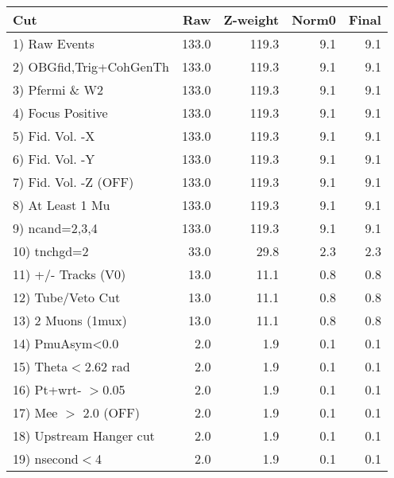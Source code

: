  \begin{table}[h!]\centering
 \begin{tabular}{||l||r|r|r|r||}
 \hline
 \hline
 Cut & Raw & Z-weight & Norm0 & Final \\
 \hline
  1) Raw Events           &       133.0 &       119.3 &         9.1 &         9.1 \\
  2) OBGfid,Trig+CohGenTh &       133.0 &       119.3 &         9.1 &         9.1 \\
  3) Pfermi \& W2         &       133.0 &       119.3 &         9.1 &         9.1 \\
  4) Focus Positive       &       133.0 &       119.3 &         9.1 &         9.1 \\
  5) Fid. Vol. -X         &       133.0 &       119.3 &         9.1 &         9.1 \\
  6) Fid. Vol. -Y         &       133.0 &       119.3 &         9.1 &         9.1 \\
  7) Fid. Vol. -Z (OFF)   &       133.0 &       119.3 &         9.1 &         9.1 \\
  8) At Least 1 Mu        &       133.0 &       119.3 &         9.1 &         9.1 \\
  9) ncand=2,3,4          &       133.0 &       119.3 &         9.1 &         9.1 \\
 10) tnchgd=2             &        33.0 &        29.8 &         2.3 &         2.3 \\
 11) +/- Tracks (V0)      &        13.0 &        11.1 &         0.8 &         0.8 \\
 12) Tube/Veto Cut        &        13.0 &        11.1 &         0.8 &         0.8 \\
 13) 2 Muons (1mux)       &        13.0 &        11.1 &         0.8 &         0.8 \\
 14) PmuAsym<0.0          &         2.0 &         1.9 &         0.1 &         0.1 \\
 15) Theta$<$2.62 rad     &         2.0 &         1.9 &         0.1 &         0.1 \\
 16) Pt+wrt- $>$0.05      &         2.0 &         1.9 &         0.1 &         0.1 \\
 17) Mee $>$ 2.0  (OFF)   &         2.0 &         1.9 &         0.1 &         0.1 \\
 18) Upstream Hanger cut  &         2.0 &         1.9 &         0.1 &         0.1 \\
 19) nsecond$<$4          &         2.0 &         1.9 &         0.1 &         0.1 \\

\end{tabular}
\end{table}
